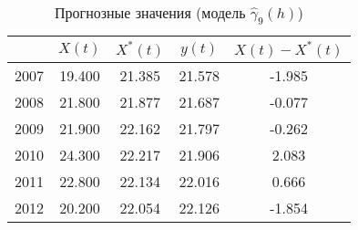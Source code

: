 \begin{table}[H]
\centering
\caption{Прогнозные значения (модель $ \widehat{\gamma}_9(h) $)} 
\label{table:auto-rob-5-prediction}
\begin{tabular}{r|cccc}
  \hline
 & $X(t)$ & $X^{*}(t)$ & $y(t)$ & $ X(t) - X^{*}(t) $ \\ 
  \hline
2007 & 19.400 & 21.385 & 21.578 & -1.985 \\ 
  2008 & 21.800 & 21.877 & 21.687 & -0.077 \\ 
  2009 & 21.900 & 22.162 & 21.797 & -0.262 \\ 
  2010 & 24.300 & 22.217 & 21.906 & 2.083 \\ 
  2011 & 22.800 & 22.134 & 22.016 & 0.666 \\ 
  2012 & 20.200 & 22.054 & 22.126 & -1.854 \\ 
   \hline
\end{tabular}
\end{table}
